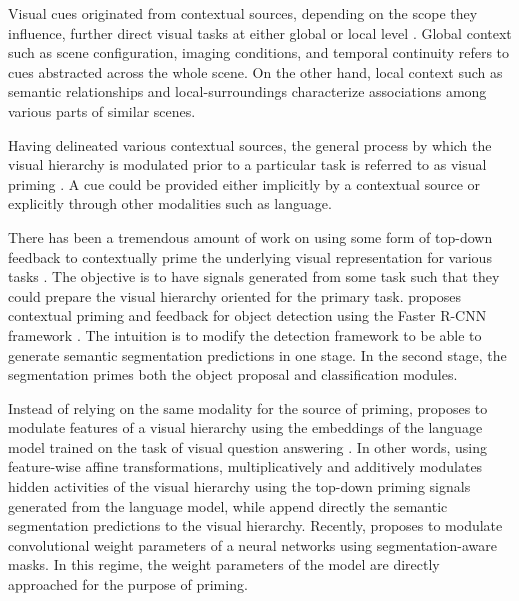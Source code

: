 \documentclass[10pt,letterpaper,twocolumn]{article}
\begin{document}
Visual cues originated from contextual sources, depending on the scope
they influence, further direct visual tasks at either global or local
level \cite{torralba2003context,torralba2003contextual}. Global context
such as scene configuration, imaging conditions, and temporal continuity
refers to cues abstracted across the whole scene. On the other hand,
local context such as semantic relationships and local-surroundings
characterize associations among various parts of similar scenes.

Having delineated various contextual sources, the general process
by which the visual hierarchy is modulated prior to a particular task
is referred to as visual priming \cite{tsotsos2011computational,posner1978attended}.
A cue could be provided either implicitly by a contextual source or
explicitly through other modalities such as language.

There has been a tremendous amount of work on using some form of top-down
feedback to contextually prime the underlying visual representation
for various tasks \cite{tulving1990priming,wig2005reductions,palmer1975effects,hollingworth1998does}.
The objective is to have signals generated from some task such that
they could prepare the visual hierarchy oriented for the primary task.
\cite{shrivastava2016contextual} proposes contextual priming and
feedback for object detection using the Faster R-CNN framework \cite{ren2015faster}.
The intuition is to modify the detection framework to be able to generate
semantic segmentation predictions in one stage. In the second stage,
the segmentation primes both the object proposal and classification
modules. 

Instead of relying on the same modality for the source of priming,
\cite{de2017modulating,perez2017film} proposes to modulate features
of a visual hierarchy using the embeddings of the language model trained
on the task of visual question answering \cite{antol2015vqa,johnson2016clevr}.
In other words, using feature-wise affine transformations, \cite{perez2017film}
multiplicatively and additively modulates hidden activities of the
visual hierarchy using the top-down priming signals generated from
the language model, while \cite{shrivastava2016contextual} append
directly the semantic segmentation predictions to the visual hierarchy.
Recently, \cite{harley2017segmentation} proposes to modulate convolutional
weight parameters of a neural networks using segmentation-aware masks.
In this regime, the weight parameters of the model are directly approached
for the purpose of priming.
\end{document}
